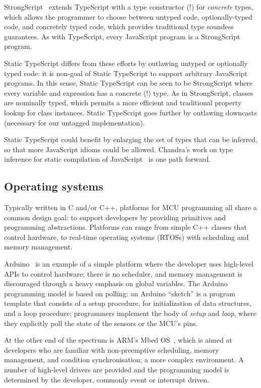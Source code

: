 StrongScript~\cite{StrongScriptECOOP15} extends TypeScript with a type constructor (!)
for \emph{concrete} types, which allows the programmer to choose between untyped
code, optionally-typed code, and concretely typed code, which provides traditional
type soundess guarantees. As with TypeScript, every JavaScript program is a StrongScript program. 

Static TypeScript differs from these efforts by outlawing untyped or optionally typed
code: it is non-goal of Static TypeScript to support arbitrary JavaScript programs.
In this sense, Static TypeScript can be seen to be StrongScript where every variable and 
expression has a concrete (!) type. As in StrongScript, classes are nominally typed,
which permits a more efficient and traditional property lookup for class instances. 
Static TypeScript goes further by outlawing downcasts (necessary for our untagged 
implementation).

Static TypeScript could benefit by enlarging the set of types
that can be inferred, so that more JavaScript idioms could be allowed. 
Chandra's work on type inference for static compilation of 
JavaScript~\cite{ChandraOOPSLA2016} is one path forward. 

\subsection{Operating systems}

Typically written in C and/or C++, platforms for MCU programming all share 
a common design goal: to support developers by providing primitives and programming 
abstractions. Platforms can range from simple C++ classes that control hardware, 
to real-time operating systems (RTOSs) with scheduling and memory management.

Arduino~\cite{buildingArduino2014} is an example of a simple platform where the developer uses 
high-level APIs to control hardware; there is no scheduler, and memory management 
is discouraged through a heavy emphasis on global variables.  The Arduino programming 
model is based on polling: an Arduino ``sketch'' is a program template that consists 
of a setup procedure, for initialization of data structures, and a loop procedure; 
programmers implement the body of \textit{setup} and \textit{loop}, where they explicitly 
poll the state of the sensors or the MCU's pins.

At the other end of the spectrum is ARM's Mbed OS~\cite{ARMmbed}, which is aimed at developers who are familiar 
with non-preemptive scheduling, memory management, and condition synchronisation; a more 
complex environment. A number of high-level drivers are provided and the programming model 
is determined by the developer, commonly event or interrupt driven.

